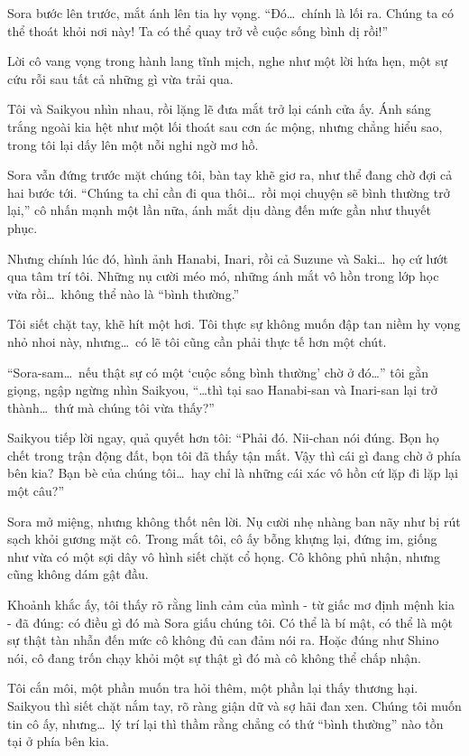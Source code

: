 \documentclass[../main.tex]{subfiles}
\begin{document}
Sora bước lên trước, mắt ánh lên tia hy vọng. ``Đó\dots\ chính là lối ra. Chúng ta có thể thoát khỏi nơi này! Ta có thể quay trở về cuộc sống bình dị rồi!''

Lời cô vang vọng trong hành lang tĩnh mịch, nghe như một lời hứa hẹn, một sự cứu rỗi sau tất cả những gì vừa trải qua.

Tôi và Saikyou nhìn nhau, rồi lặng lẽ đưa mắt trở lại cánh cửa ấy. Ánh sáng trắng ngoài kia hệt như một lối thoát sau cơn ác mộng, nhưng chẳng hiểu sao, trong tôi lại dấy lên một nỗi nghi ngờ mơ hồ.

Sora vẫn đứng trước mặt chúng tôi, bàn tay khẽ giơ ra, như thể đang chờ đợi cả hai bước tới. ``Chúng ta chỉ cần đi qua thôi\dots\ rồi mọi chuyện sẽ bình thường trở lại,'' cô nhấn mạnh một lần nữa, ánh mắt dịu dàng đến mức gần như thuyết phục.

Nhưng chính lúc đó, hình ảnh Hanabi, Inari, rồi cả Suzune và Saki\dots\ họ cứ lướt qua tâm trí tôi. Những nụ cười méo mó, những ánh mắt vô hồn trong lớp học vừa rồi\dots\ không thể nào là ``bình thường.''

Tôi siết chặt tay, khẽ hít một hơi. Tôi thực sự không muốn đập tan niềm hy vọng nhỏ nhoi này, nhưng\dots\ có lẽ tôi cũng cần phải thực tế hơn một chút.

``Sora-sam\dots\ nếu thật sự có một `cuộc sống bình thường' chờ ở đó\dots'' tôi gằn giọng, ngập ngừng nhìn Saikyou, ``\dots thì tại sao Hanabi-san và Inari-san lại trở thành\dots\ thứ mà chúng tôi vừa thấy?''

Saikyou tiếp lời ngay, quả quyết hơn tôi: ``Phải đó. Nii-chan nói đúng. Bọn họ chết trong trận động đất, bọn tôi đã thấy tận mắt. Vậy thì cái gì đang chờ ở phía bên kia? Bạn bè của chúng tôi\dots\ hay chỉ là những cái xác vô hồn cứ lặp đi lặp lại một câu?''

Sora mở miệng, nhưng không thốt nên lời. Nụ cười nhẹ nhàng ban nãy như bị rút sạch khỏi gương mặt cô. Trong mắt tôi, cô ấy bỗng khựng lại, đứng im, giống như vừa có một sợi dây vô hình siết chặt cổ họng. Cô không phủ nhận, nhưng cũng không dám gật đầu.

Khoảnh khắc ấy, tôi thấy rõ rằng linh cảm của mình - từ giấc mơ định mệnh kia - đã đúng: có điều gì đó mà Sora giấu chúng tôi. Có thể là bí mật, có thể là một sự thật tàn nhẫn đến mức cô không đủ can đảm nói ra. Hoặc đúng như Shino nói, cô đang trốn chạy khỏi một sự thật gì đó mà cô không thể chấp nhận.

Tôi cắn môi, một phần muốn tra hỏi thêm, một phần lại thấy thương hại. Saikyou thì siết chặt nắm tay, rõ ràng giận dữ và sợ hãi đan xen. Chúng tôi muốn tin cô ấy, nhưng\dots\ lý trí lại thì thầm rằng chẳng có thứ ``bình thường'' nào tồn tại ở phía bên kia.
\end{document}

